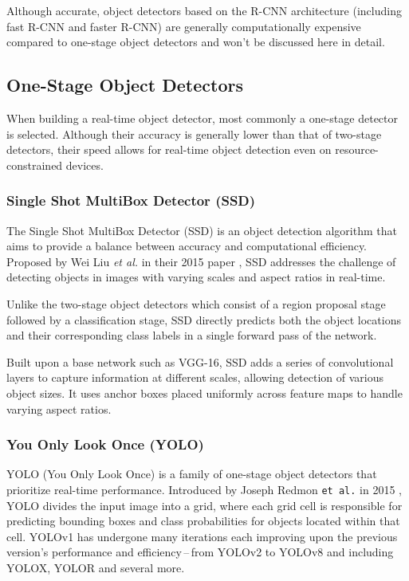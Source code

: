 Although accurate, object detectors based on the R-CNN architecture (including
fast R-CNN and faster R-CNN) are generally computationally expensive compared to
one-stage object detectors and won't be discussed here in detail.


\subsection{One-Stage Object Detectors}

When building a real-time object detector, most commonly a one-stage detector is
selected. Although their accuracy is generally lower than that of two-stage
detectors, their speed allows for real-time object detection even on
resource-constrained devices.

\subsubsection{Single Shot MultiBox Detector (SSD)}

The Single Shot MultiBox Detector (SSD) is an object detection algorithm that
aims to provide a balance between accuracy and computational efficiency.
Proposed by Wei Liu \textit{et al.} in their 2015 paper \cite{Liu2015}, SSD
addresses the challenge of detecting objects in images with varying scales and
aspect ratios in real-time.

Unlike the two-stage object detectors which consist of a region proposal stage
followed by a classification stage, SSD directly predicts both the object
locations and their corresponding class labels in a single forward pass of the
network.

Built upon a base network such as VGG-16, SSD adds a series of convolutional
layers to capture information at different scales, allowing detection of various
object sizes. It uses anchor boxes placed uniformly across feature maps to
handle varying aspect ratios.

\subsubsection{You Only Look Once (YOLO)}

YOLO (You Only Look Once) is a family of one-stage object detectors that
prioritize real-time performance. Introduced by Joseph Redmon \texttt{et al.} in
2015 \cite{Redmon2015}, YOLO divides the input image into a grid, where each
grid cell is responsible for predicting bounding boxes and class probabilities
for objects located within that cell. YOLOv1 has undergone many iterations each
improving upon the previous version's performance and efficiency\,--\,from
YOLOv2 to YOLOv8 and including YOLOX, YOLOR and several more.

